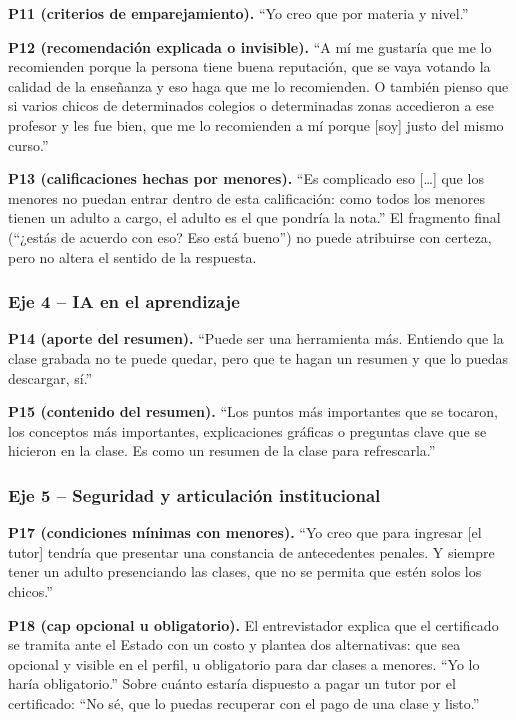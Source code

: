 \textbf{P11 (criterios de emparejamiento).} ``Yo creo que por materia y
nivel.''

\textbf{P12 (recomendación explicada o invisible).} ``A mí me gustaría
que me lo recomienden porque la persona tiene buena reputación, que se
vaya votando la calidad de la enseñanza y eso haga que me lo recomienden.
O también pienso que si varios chicos de determinados colegios o
determinadas zonas accedieron a ese profesor y les fue bien, que me lo
recomienden a mí porque [soy] justo del mismo curso.''

\textbf{P13 (calificaciones hechas por menores).} ``Es complicado eso
[\ldots] que los menores no puedan entrar dentro de esta calificación:
como todos los menores tienen un adulto a cargo, el adulto es el que
pondría la nota.'' El fragmento final (``¿estás de acuerdo con eso? Eso
está bueno'') no puede atribuirse con certeza, pero no altera el sentido
de la respuesta.

\subsubsection*{Eje 4 -- IA en el aprendizaje}

\textbf{P14 (aporte del resumen).} ``Puede ser una herramienta más.
Entiendo que la clase grabada no te puede quedar, pero que te hagan un
resumen y que lo puedas descargar, sí.''

\textbf{P15 (contenido del resumen).} ``Los puntos más importantes que se
tocaron, los conceptos más importantes, explicaciones gráficas o
preguntas clave que se hicieron en la clase. Es como un resumen de la
clase para refrescarla.''

\subsubsection*{Eje 5 -- Seguridad y articulación institucional}

\textbf{P17 (condiciones mínimas con menores).} ``Yo creo que para
ingresar [el tutor] tendría que presentar una constancia de antecedentes
penales. Y siempre tener un adulto presenciando las clases, que no se
permita que estén solos los chicos.''

\textbf{P18 (\gls{cap} opcional u obligatorio).} El entrevistador explica
que el certificado se tramita ante el Estado con un costo y plantea dos
alternativas: que sea opcional y visible en el perfil, u obligatorio para
dar clases a menores. ``Yo lo haría obligatorio.'' Sobre cuánto estaría
dispuesto a pagar un tutor por el certificado: ``No sé, que lo puedas
recuperar con el pago de una clase y listo.''

